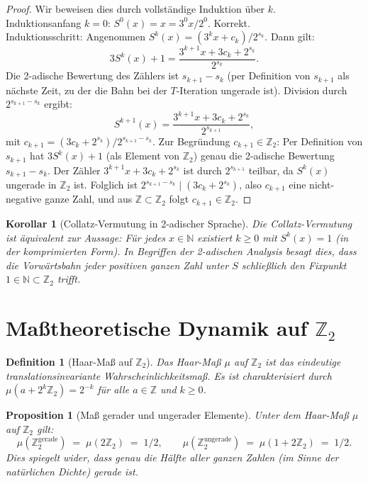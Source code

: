 \documentclass[12pt,a4paper]{article}
\newtheorem{proposition}[theorem]{Proposition}
\newtheorem{corollary}[theorem]{Korollar}
\newtheorem{definition}[theorem]{Definition}
\begin{document}
\begin{proof}
Wir beweisen dies durch vollständige Induktion über $k$.\\
Induktionsanfang $k=0$: $S^0(x) = x = 3^0 x / 2^0$. Korrekt.\\
Induktionsschritt: Angenommen $S^k(x) = (3^k x + c_k)/2^{s_k}$. Dann gilt:
\[
  3 S^k(x) + 1 = \frac{3^{k+1} x + 3c_k + 2^{s_k}}{2^{s_k}}.
\]
Die 2-adische Bewertung des Zählers ist $s_{k+1} - s_k$ (per Definition von $s_{k+1}$
als nächste Zeit, zu der die Bahn bei der $T$-Iteration ungerade ist). Division durch
$2^{s_{k+1}-s_k}$ ergibt:
\[
  S^{k+1}(x) = \frac{3^{k+1} x + 3c_k + 2^{s_k}}{2^{s_{k+1}}},
\]
mit $c_{k+1} = (3c_k + 2^{s_k})/2^{s_{k+1}-s_k}$.
Zur Begr\"undung $c_{k+1} \in \mathbb{Z}_2$: Per Definition von $s_{k+1}$
hat $3S^k(x)+1$ (als Element von $\mathbb{Z}_2$) genau die 2-adische Bewertung
$s_{k+1} - s_k$. Der Z\"ahler $3^{k+1}x + 3c_k + 2^{s_k}$ ist durch
$2^{s_{k+1}}$ teilbar, da $S^k(x)$ ungerade in $\mathbb{Z}_2$ ist.
Folglich ist $2^{s_{k+1}-s_k} \mid (3c_k + 2^{s_k})$, also $c_{k+1}$
eine nicht-negative ganze Zahl, und aus $\mathbb{Z} \subset \mathbb{Z}_2$
folgt $c_{k+1} \in \mathbb{Z}_2$.
\end{proof}

\begin{corollary}[Collatz-Vermutung in 2-adischer Sprache]\label{cor:reformulierung}
Die Collatz-Vermutung ist äquivalent zur Aussage: Für jedes $x \in \mathbb{N}$ existiert
$k \geq 0$ mit $S^k(x) = 1$ (in der komprimierten Form). In Begriffen der 2-adischen
Analysis besagt dies, dass die Vorwärtsbahn jeder positiven ganzen Zahl unter $S$
schließlich den Fixpunkt $1 \in \mathbb{N} \subset \mathbb{Z}_2$ trifft.
\end{corollary}

\section{Maßtheoretische Dynamik auf $\mathbb{Z}_2$}\label{sec:dynamik}

\begin{definition}[Haar-Maß auf $\mathbb{Z}_2$]\label{def:haar}
Das \emph{Haar-Maß} $\mu$ auf $\mathbb{Z}_2$ ist das eindeutige translationsinvariante
Wahrscheinlichkeitsmaß. Es ist charakterisiert durch $\mu(a + 2^k \mathbb{Z}_2) = 2^{-k}$
für alle $a \in \mathbb{Z}$ und $k \geq 0$.
\end{definition}

\begin{proposition}[Maß gerader und ungerader Elemente]\label{prop:parit_mass}
Unter dem Haar-Maß $\mu$ auf $\mathbb{Z}_2$ gilt:
\[
  \mu(\mathbb{Z}_2^{\text{gerade}}) \;=\; \mu(2\mathbb{Z}_2) \;=\; 1/2,
\qquad
  \mu(\mathbb{Z}_2^{\text{ungerade}}) \;=\; \mu(1 + 2\mathbb{Z}_2) \;=\; 1/2.
\]
Dies spiegelt wider, dass genau die Hälfte aller ganzen Zahlen (im Sinne der natürlichen
Dichte) gerade ist.
\end{proposition}
\end{document}
